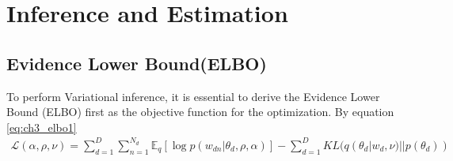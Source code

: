 \section{Inference and Estimation}
\subsection{Evidence Lower Bound(ELBO)}\label{ch3:2} To perform Variational inference, it is essential to derive the Evidence Lower Bound (ELBO) first as the objective function for the optimization. By equation \ref{eq:ch3_elbo1}
\begin{align}\label{eq:ch3_elbo1}
\mathcal{L}(\alpha,\rho,\nu)=\sum_{d=1}^{D}\sum_{n=1}^{N_d}\mathbb{E}_q[\log p(w_{dn}|\theta_d,\rho,\alpha)]-\sum_{d=1}^{D}KL(q(\theta_d|w_d,\nu)||p(\theta_d))
\end{align}
